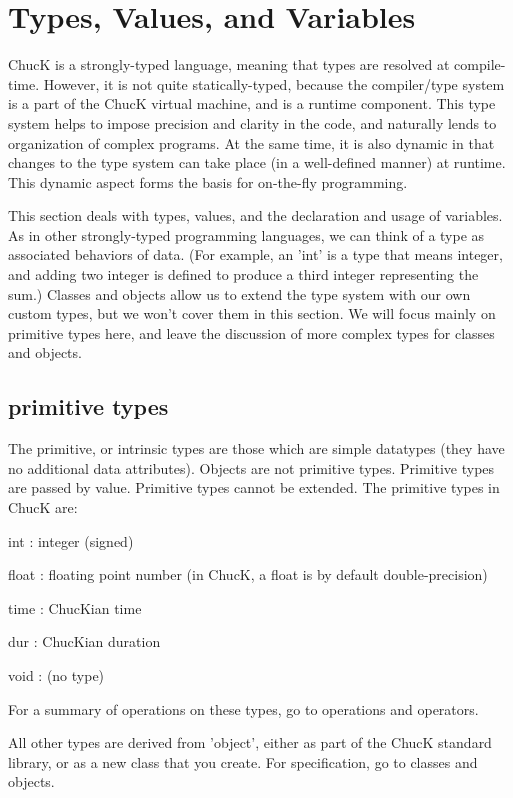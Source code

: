 \chapter{Types, Values, and Variables}

ChucK is a strongly-typed language, meaning that types are resolved at compile-time. However, it is not quite statically-typed, because the compiler/type system is a part of the ChucK virtual machine, and is a runtime component. This type system helps to impose precision and clarity in the code, and naturally lends to organization of complex programs. At the same time, it is also dynamic in that changes to the type system can take place (in a well-defined manner) at runtime. This dynamic aspect forms the basis for on-the-fly programming.

This section deals with types, values, and the declaration and usage of variables. As in other strongly-typed programming languages, we can think of a type as associated behaviors of data. (For example, an 'int' is a type that means integer, and adding two integer is defined to produce a third integer representing the sum.) Classes and objects allow us to extend the type system with our own custom types, but we won't cover them in this section. We will focus mainly on primitive types here, and leave the discussion of more complex types for classes and objects.

\section{primitive types}

The primitive, or intrinsic types are those which are simple datatypes (they have no additional data attributes). Objects are not primitive types. Primitive types are passed by value. Primitive types cannot be extended. The primitive types in ChucK are:
\begin{chuckitemize}
\item  int : integer (signed)
\item  float : floating point number (in ChucK, a float is by default double-precision)
\item  time : ChucKian time
\item  dur : ChucKian duration
\item  void : (no type)
\end{chuckitemize}
For a summary of operations on these types, go to operations and operators.

All other types are derived from 'object', either as part of the ChucK standard library, or as a new class that you create. For specification, go to classes and objects.


